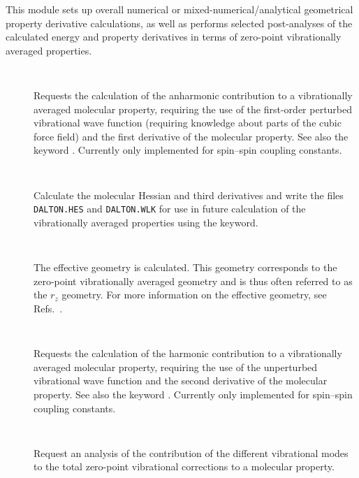 This module sets up overall numerical or mixed-numerical/analytical
geometrical property derivative calculations, as well as performs selected
post-analyses of the calculated energy and property derivatives in
terms of zero-point vibrationally averaged properties.

\begin{description}

\item[]\verb| |\newline

Requests the calculation of the anharmonic contribution to a
vibrationally averaged molecular property, requiring the use of the
first-order perturbed vibrational wave function (requiring knowledge
about parts of the cubic force field) and the first derivative of the
molecular property. See also the keyword . Currently only
implemented for spin--spin coupling constants.

\item[]\verb| |\newline

Calculate the molecular Hessian and third derivatives and write the files
\verb|DALTON.HES| and \verb|DALTON.WLK| for use in future 
calculation of the vibrationally averaged properties using the
 keyword.

\item[]\verb| |\newline

The effective geometry is calculated. This geometry corresponds to the
zero-point vibrationally averaged geometry and is thus often referred
to as the $r_z$ geometry. For more information on the effective
geometry, see Refs.~\cite{poakrprtjcp112,krpoaprtjcp112}.

\item[]\verb| |\newline

Requests the calculation of the harmonic contribution to a
vibrationally averaged molecular property, requiring the use of the
unperturbed vibrational wave function and the second derivative of the
molecular property. See also the keyword . Currently only
implemented for spin--spin coupling constants.

\item[]\verb| |\newline

Request an analysis of the contribution of the different vibrational modes
to the total zero-point vibrational corrections to a molecular property.


\end{description}
